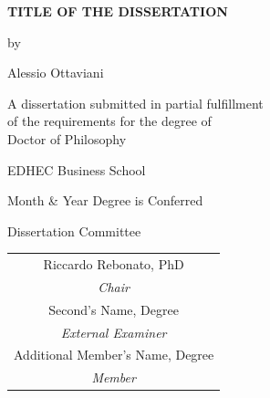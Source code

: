 \thispagestyle{empty}

\begin{center}

\vspace*{1.5in}

{\Large\bfseries TITLE OF THE DISSERTATION}

\vspace{1in}

by

\vspace{0.5in}

{\large Alessio Ottaviani}

\vspace{1in}

A dissertation submitted in partial fulfillment\\
of the requirements for the degree of\\[0.5em]
{\large Doctor of Philosophy}

\vspace{0.5in}

EDHEC Business School

\vspace{0.5in}

Month \& Year Degree is Conferred

\vspace{1in}

{\normalsize Dissertation Committee}

\vspace{0.3in}

\begin{tabular}{c}
  Riccardo Rebonato, PhD \\
  \textit{Chair} \\[1em]
  Second's Name, Degree \\
  \textit{External Examiner} \\[1em]
  Additional Member's Name, Degree \\
  \textit{Member}
\end{tabular}

\end{center}
